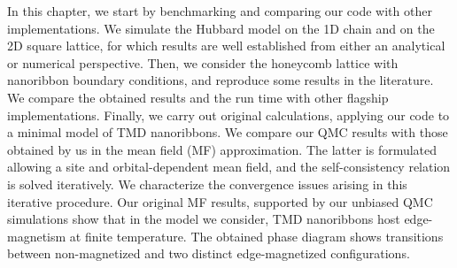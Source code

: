 
\label{cap:applications}

\slshape

In this chapter, we start by benchmarking and comparing our code with other implementations.
We simulate the Hubbard model on the \acs{1D} chain and on the \acs{2D} square lattice, for which results are well established from either an analytical or numerical perspective.
Then, we consider the honeycomb lattice with  nanoribbon boundary conditions, and reproduce some results in the literature.
We compare the obtained results and the run time with other flagship implementations.
Finally, we carry out original calculations, applying our code to a minimal model of \acs{TMD} nanoribbons.
We compare our \acs{QMC} results with those obtained by us in the mean field (MF)  approximation.
The latter is formulated allowing a site and orbital-dependent mean field, and the self-consistency relation is solved iteratively.
We characterize the convergence issues arising in this iterative procedure.
Our original MF results, supported by our unbiased \acs{QMC} simulations show that in the model we consider, \acs{TMD} nanoribbons host edge-magnetism at finite temperature.
The obtained phase diagram shows  transitions between non-magnetized and two distinct edge-magnetized configurations.

\normalfont




